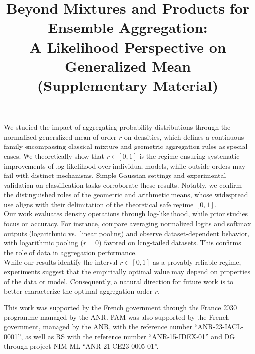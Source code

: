 \documentclass[accepted]{uai2026} %
\begin{document}
We studied the impact of aggregating probability distributions through the normalized generalized mean of order $r$ on densities, which defines a continuous family encompassing classical mixture and geometric aggregation rules as special cases. We theoretically show that $r \in [0,1]$ is the regime ensuring systematic improvements of log-likelihood over individual models, while outside orders may fail with distinct mechanisms. Simple Gaussian settings and experimental validation on classification tasks corroborate these results. Notably, we confirm the distinguished roles of the geometric and arithmetic means, whose widespread use aligns with their delimitation of the theoretical safe regime $[0,1]$. \\ Our work evaluates density operations through log-likelihood, while prior studies focus on accuracy. For instance, \citet{buchanan2023effects} compare averaging normalized logits and softmax outputs (logarithmic vs.\ linear pooling) and observe dataset-dependent behavior, with logarithmic pooling ($r=0$) favored on long-tailed datasets. This confirms the role of data in aggregation performance.\\ While our results identify the interval $r \in [0,1]$ as a provably reliable regime, experiments suggest that the empirically optimal value may depend on properties of the data or model. Consequently, a natural direction for future work is to better characterize the optimal aggregation order $r$.                                      

\begin{acknowledgements}
This work was supported by the French government through the France 2030 programme managed by the ANR.
PAM was also supported by the French government, managed by the ANR, with the reference number “ANR-23-IACL-0001”, as well as RS with the reference number “ANR-15-IDEX-01” and DG through
project NIM-ML “ANR-21-CE23-0005-01”.
\end{acknowledgements}



\newpage

\onecolumn

\title{Beyond Mixtures and Products for Ensemble Aggregation: \\ A Likelihood Perspective on Generalized Mean
\\ (Supplementary Material)}
\maketitle
\end{document}
